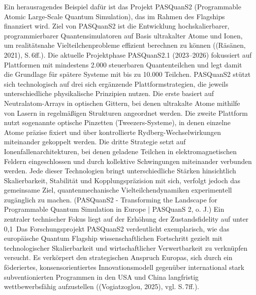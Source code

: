 Ein herausragendes Beispiel dafür ist das Projekt PASQuanS2 (Programmable Atomic Large-Scale Quantum Simulation), das im Rahmen des Flagships finanziert wird. Ziel von PASQuanS2 ist die Entwicklung hochskalierbarer, programmierbarer Quantensimulatoren auf Basis ultrakalter Atome und Ionen, um realitätsnahe Vielteilchenprobleme effizient berechnen zu können ((Räsänen, 2021), S. 6ff.). Die aktuelle Projektphase PASQuanS2.1 (2023–2026) fokussiert auf Plattformen mit mindestens 2.000 steuerbaren Quantenteilchen und legt damit die Grundlage für spätere Systeme mit bis zu 10.000 Teilchen. 
PASQuanS2 stützt sich technologisch auf drei sich ergänzende Plattformstrategien, die jeweils unterschiedliche physikalische Prinzipien nutzen. Die erste basiert auf Neutralatom-Arrays in optischen Gittern, bei denen ultrakalte Atome mithilfe von Lasern in regelmäßigen Strukturen angeordnet werden. Die zweite Plattform nutzt sogenannte optische Pinzetten (Tweezers-Systeme), in denen einzelne Atome präzise fixiert und über kontrollierte Rydberg-Wechselwirkungen miteinander gekoppelt werden. Die dritte Strategie setzt auf Ionenfallenarchitekturen, bei denen geladene Teilchen in elektromagnetischen Feldern eingeschlossen und durch kollektive Schwingungen miteinander verbunden werden. Jede dieser Technologien bringt unterschiedliche Stärken hinsichtlich Skalierbarkeit, Stabilität und Kopplungspräzision mit sich, verfolgt jedoch das gemeinsame Ziel, quantenmechanische Vielteilchendynamiken experimentell zugänglich zu machen. (PASQuanS2 - Transforming the Landscape for Programmable Quantum Simulation in Europe | PASQuanS 2, o. J.) Ein zentraler technischer Fokus liegt auf der Erhöhung der Zustandsfidelity auf unter 0,1 %
Das Forschungsprojekt PASQuanS2 verdeutlicht exemplarisch, wie das europäische Quantum Flagship wissenschaftlichen Fortschritt gezielt mit technologischer Skalierbarkeit und wirtschaftlicher Verwertbarkeit zu verknüpfen versucht. Es verkörpert den strategischen Anspruch Europas, sich durch ein föderiertes, konsensorientiertes Innovationsmodell gegenüber international stark subventionierten Programmen in den USA und China langfristig wettbewerbsfähig aufzustellen ((Vogiatzoglou, 2025), vgl. S. 7ff.).
 

